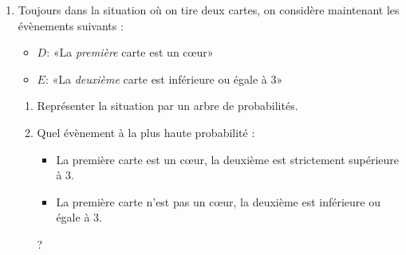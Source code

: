 \documentclass[
	classe=$1^{ere}STI2D$
]{exercice}
\begin{document}
\begin{enumerate}
	\item Toujours dans la situation où on tire deux cartes, on considère maintenant les évènements suivants :
	      \begin{itemize}
		      \item $D$: «La \textit{première} carte est un cœur»
		      \item $E$: «La \textit{deuxième} carte est inférieure ou égale à $3$»
	      \end{itemize}
	      \begin{enumerate}
		      \item Représenter la situation par un arbre de probabilités.
		      \item Quel évènement à la plus haute probabilité :
		            \begin{itemize}
			            \item La première carte est un cœur, la deuxième est strictement supérieure à $3$.
			            \item La première carte n'est pas un cœur, la deuxième est inférieure ou égale à $3$.
		            \end{itemize}
		            ?
	      \end{enumerate}
\end{enumerate}
\end{document}
